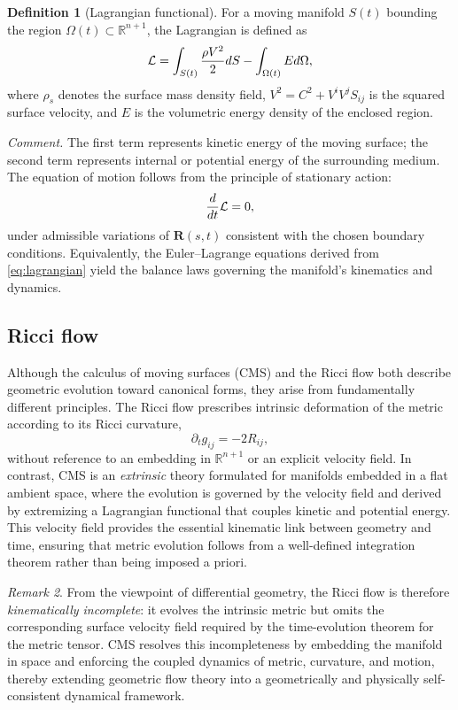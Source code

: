 \documentclass[11pt]{article}
\theoremstyle{definition}
\newtheorem{definition}{Definition}[section]
\theoremstyle{plain}
\theoremstyle{remark}
\newtheorem{remark}[definition]{Remark}
\begin{document}
\begin{definition}[Lagrangian functional]\label{def:lagrangian}
For a moving manifold $S(t)$ bounding the region $\Omega(t)\subset\mathbb{R}^{n+1}$,
the Lagrangian is defined as
\begin{equation}
\sloppy\label{eq:lagrangian}
\mathcal{L}= \int_{S(t)} \frac{\rho V^2}{2}dS-\int_{\Omega(t)} Ed\Omega,
\end{equation}
\fussy
where $\rho_s$ denotes the surface mass density field, $V^2=C^2+V^iV^jS_{ij}$ is the squared surface velocity, 
and $E$ is the volumetric energy density of the enclosed region.
\end{definition}

\noindent\emph{Comment.}
The first term represents kinetic energy of the moving surface; the second term represents internal or potential energy of the surrounding medium.  
The equation of motion follows from the principle of stationary action:
\begin{equation}
\sloppy\label{eq:variational-principle}
\frac{d}{dt} \mathcal{L}= 0,
\end{equation}
\fussy
under admissible variations of $\mathbf{R}(s,t)$ consistent with the chosen boundary conditions.  
Equivalently, the Euler–Lagrange equations derived from \eqref{eq:lagrangian} yield the balance laws governing the manifold’s kinematics and dynamics.


\subsection{Ricci flow}
Although the calculus of moving surfaces (CMS) and the Ricci flow both describe geometric evolution toward canonical forms, they arise from fundamentally different principles.  
The Ricci flow prescribes intrinsic deformation of the metric according to its Ricci curvature,
\[
\partial_t g_{ij} = -2 R_{ij},
\]
without reference to an embedding in $\mathbb{R}^{n+1}$ or an explicit velocity field.  
In contrast, CMS is an \emph{extrinsic} theory formulated for manifolds embedded in a flat ambient space, where the evolution is governed by the velocity field
and derived by extremizing a Lagrangian functional that couples kinetic and potential energy.  
This velocity field provides the essential kinematic link between geometry and time, ensuring that metric evolution follows from a well-defined integration theorem rather than being imposed a priori.  

\begin{remark}
From the viewpoint of differential geometry, the Ricci flow is therefore \emph{kinematically incomplete}: it evolves the intrinsic metric but omits the corresponding surface velocity field required by the time-evolution theorem for the metric tensor.  
CMS resolves this incompleteness by embedding the manifold in space and enforcing the coupled dynamics of metric, curvature, and motion, thereby extending geometric flow theory into a geometrically and physically self-consistent dynamical framework.
\end{remark}
\end{document}
